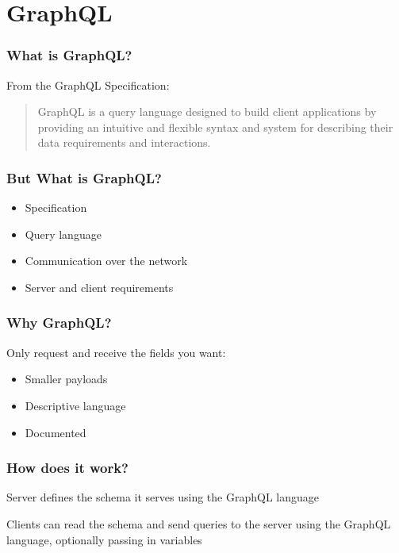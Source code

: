 \documentclass{beamer}
\begin{document}
\section{GraphQL}
\begin{frame}
  \frametitle{What is GraphQL?}  From the GraphQL
  Specification\cite{graphql-spec}:
  \begin{quote}
    GraphQL is a query language designed to build client applications
    by providing an intuitive and flexible syntax and system for
    describing their data requirements and interactions.
  \end{quote}
\end{frame}


\begin{frame}
  \frametitle{But What is GraphQL?}

  \begin{itemize}
  \item Specification
  \item Query language
  \item Communication over the network
  \item Server and client requirements
  \end{itemize}
\end{frame}


\begin{frame}
  \frametitle{Why GraphQL?}
  Only request and receive the fields you want:
  \begin{itemize}
  \item Smaller payloads
  \item Descriptive language
  \item Documented
  \end{itemize}
\end{frame}


\begin{frame}
  \frametitle{How does it work?}
  Server defines the schema it serves using the GraphQL language

  \vspace{1em}
  Clients can read the schema and send queries to the server using the GraphQL language, optionally passing in variables
\end{frame}
\end{document}
